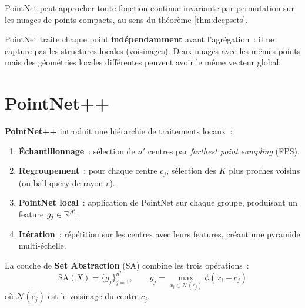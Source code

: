 \begin{proposition}
PointNet peut approcher toute fonction continue invariante par
permutation sur les nuages de points compacts, au sens du
th\'eor\`eme \ref{thm:deepsets}.
\end{proposition}

\begin{attention}[title=\textbf{Limitations de PointNet}]
PointNet traite chaque point \textbf{ind\'ependamment} avant
l'agr\'egation~: il ne capture pas les structures locales
(voisinages). Deux nuages avec les m\^emes points mais des
g\'eom\'etries locales diff\'erentes peuvent avoir le m\^eme
vecteur global.
\end{attention}

\section{PointNet++}
\label{sec:pointnetpp}

\begin{definition}
\textbf{PointNet++} introduit une hi\'erarchie de traitements
locaux~:
\begin{enumerate}
  \item \textbf{\'Echantillonnage}~: s\'election de $n'$ centres
        par \emph{farthest point sampling} (FPS).
  \item \textbf{Regroupement}~: pour chaque centre $c_j$, s\'election
        des $K$ plus proches voisins (ou ball query de rayon $r$).
  \item \textbf{PointNet local}~: application de PointNet sur chaque
        groupe, produisant un feature $g_j \in \mathbb{R}^{d'}$.
  \item \textbf{It\'eration}~: r\'ep\'etition sur les centres avec
        leurs features, cr\'eant une pyramide multi-\'echelle.
\end{enumerate}
\end{definition}

\begin{definition}
La couche de \textbf{Set Abstraction} (SA) combine les trois
op\'erations~:
\[
  \mathrm{SA}(X) = \{g_j\}_{j=1}^{n'}, \qquad
  g_j = \max_{x_i \in \mathcal{N}(c_j)} \phi(x_i - c_j)
\]
o\`u $\mathcal{N}(c_j)$ est le voisinage du centre $c_j$.
\end{definition}

